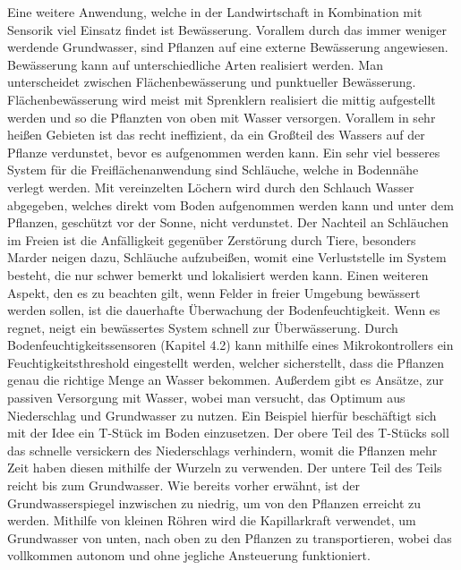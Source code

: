 Eine weitere Anwendung, welche in der Landwirtschaft in Kombination mit
Sensorik viel Einsatz findet ist Bewässerung. Vorallem durch das immer weniger
werdende Grundwasser, sind Pflanzen auf eine externe Bewässerung angewiesen.
\cite{liu2018self} Bewässerung kann auf unterschiedliche Arten realisiert
werden. Man unterscheidet zwischen Flächenbewässerung und punktueller
Bewässerung. Flächenbewässerung wird meist mit Sprenklern realisiert die mittig
aufgestellt werden und so die Pflanzten von oben mit Wasser versorgen. Vorallem
in sehr heißen Gebieten ist das recht ineffizient, da ein Großteil des Wassers
auf der Pflanze verdunstet, bevor es aufgenommen werden kann. Ein sehr viel
besseres System für die Freiflächenanwendung sind Schläuche, welche in
Bodennähe verlegt werden. Mit vereinzelten Löchern wird durch den Schlauch
Wasser abgegeben, welches direkt vom Boden aufgenommen werden kann und unter
dem Pflanzen, geschützt vor der Sonne, nicht verdunstet. Der Nachteil an
Schläuchen im Freien ist die Anfälligkeit gegenüber Zerstörung durch Tiere,
besonders Marder neigen dazu, Schläuche aufzubeißen, womit eine Verluststelle
im System besteht, die nur schwer bemerkt und lokalisiert werden kann. Einen
weiteren Aspekt, den es zu beachten gilt, wenn Felder in freier Umgebung
bewässert werden sollen, ist die dauerhafte Überwachung der Bodenfeuchtigkeit.
Wenn es regnet, neigt ein bewässertes System schnell zur Überwässerung. Durch
Bodenfeuchtigkeitssensoren (Kapitel 4.2) kann mithilfe eines Mikrokontrollers
ein Feuchtigkeitsthreshold eingestellt werden, welcher sicherstellt, dass die
Pflanzen genau die richtige Menge an Wasser bekommen. Außerdem gibt es Ansätze,
zur passiven Versorgung mit Wasser, wobei man versucht, das Optimum aus
Niederschlag und Grundwasser zu nutzen. Ein Beispiel hierfür beschäftigt sich
mit der Idee ein T-Stück im Boden einzusetzen. Der obere Teil des T-Stücks soll
das schnelle versickern des Niederschlags verhindern, womit die Pflanzen mehr
Zeit haben diesen mithilfe der Wurzeln zu verwenden. Der untere Teil des Teils
reicht bis zum Grundwasser. Wie bereits vorher erwähnt, ist der
Grundwasserspiegel inzwischen zu niedrig, um von den Pflanzen erreicht zu
werden. Mithilfe von kleinen Röhren wird die Kapillarkraft verwendet, um
Grundwasser von unten, nach oben zu den Pflanzen zu transportieren, wobei das
vollkommen autonom und ohne jegliche Ansteuerung funktioniert. \cite{liu2018self}